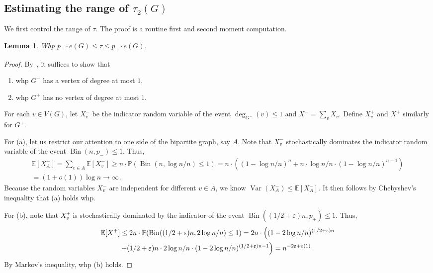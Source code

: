 \documentclass[reqno,final,a4paper]{amsart}
\numberwithin{equation}{section}
\newtheorem{lemma}[theorem]{Lemma}
\theoremstyle{definition}
\theoremstyle{remark}
\renewcommand{\Pr}{\mathbb{P}}
\newcommand{\E}{\mathbb{E}}
\newcommand{\eps}{\varepsilon}
\newcommand{\Var}{\operatorname{Var}}
\newcommand{\Bin}{\operatorname{Bin}}
\begin{document}
\subsection{Estimating the range of 
\texorpdfstring{$\tau_2(G)$}{τ2(G)}}
We first control the range of $\tau$. The proof is a routine first and second moment computation. 
\begin{lemma}\label{lem:hitting-time-window}
    Whp $p_-\cdot e(G)\leq\tau\leq p_+ \cdot e(G)$.
\end{lemma}
\begin{proof}
    By~, it suffices to show that 
    \begin{enumerate}[label=(\alph*)]
        \item whp $G^-$ has a vertex of degree at most $1$,
        \item whp $G^+$ has no vertex of degree at most $1$.
    \end{enumerate}
    
    For each $v\in V(G)$, let $X_v^-$ be the indicator random variable of the event $\deg_{G^-}(v)\leq 1$ and $X^- = \sum_{v}X_v$. Define $X_v^+$ and $X^+$ similarly for $G^+$. 

    For (a), let us restrict our attention to one side of the bipartite graph, say $A$. Note that $X_v^-$ stochastically dominates the indicator random variable of the event $\Bin(n, p_-)\leq 1$. Thus, 
    \begin{multline*}
        \E[X_A^-] = \sum_{v\in A}\E[X_v^-] \geq n\cdot \Pr(\Bin(n, \log n/n)\leq 1) 
        = n\cdot \left((1-\log n/n)^{n} + n\cdot \log n/n\cdot (1-\log n/n)^{n-1}\right)\\ = (1+o(1))\log n\rightarrow \infty\,.
    \end{multline*}
    Because the random variables $X_v^-$ are independent for different $v\in A$, we know $\Var(X_A^-)\leq \E[X_A^-]$. It then follows by Chebyshev's inequality that (a) holds whp.

    For (b), note that $X_v^+$ is stochastically dominated by the indicator of the event $\Bin((1/2 +\eps)n,p_+)\leq 1$. Thus,
    \begin{multline*}
        \E[X^+]\leq 2n\cdot \Pr(\Bin((1/2 +\eps)n, 2\log n/n)\leq 1) = 2n\cdot \Bigl((1-2\log n/n)^{(1/2 +\eps)n} \\+ (1/2 +\eps)n\cdot 2\log n/n\cdot  (1-2\log n/n)^{(1/2+\eps)n-1}\Bigr) = n^{-2\eps + o(1)}\,.
    \end{multline*}
    By Markov's inequality, whp (b) holds.
\end{proof}
\end{document}
